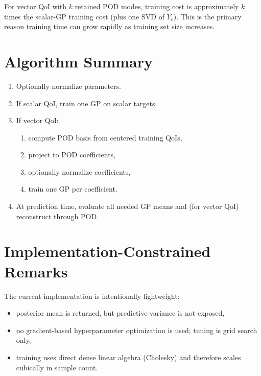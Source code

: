 \documentclass[11pt]{article}
\begin{document}
For vector QoI with $k$ retained POD modes, training cost is approximately
$k$ times the scalar-GP training cost (plus one SVD of $Y_c$).
This is the primary reason training time can grow rapidly as training set size increases.

\section{Algorithm Summary}
\begin{enumerate}[leftmargin=1.5em]
\item Optionally normalize parameters.
\item If scalar QoI, train one GP on scalar targets.
\item If vector QoI:
\begin{enumerate}[label*=\arabic*.,leftmargin=1.5em]
\item compute POD basis from centered training QoIs,
\item project to POD coefficients,
\item optionally normalize coefficients,
\item train one GP per coefficient.
\end{enumerate}
\item At prediction time, evaluate all needed GP means and (for vector QoI) reconstruct through POD.
\end{enumerate}

\section{Implementation-Constrained Remarks}
The current implementation is intentionally lightweight:
\begin{itemize}[leftmargin=1.5em]
\item posterior mean is returned, but predictive variance is not exposed,
\item no gradient-based hyperparameter optimization is used; tuning is grid search only,
\item training uses direct dense linear algebra (Cholesky) and therefore scales cubically in sample count.
\end{itemize}
\end{document}
